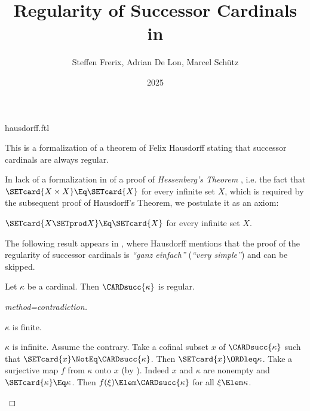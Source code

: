 \documentclass{stex}
\title{Regularity of Successor Cardinals in \Naproche}
\author{Steffen Frerix, Adrian De Lon, Marcel Schütz}
\date{2025}
\begin{document}
\begin{smodule}{hausdorff.ftl}
\maketitle



\noindent This is a formalization of a theorem of Felix Hausdorff stating that
successor cardinals are always regular.

In lack of a formalization in \Naproche of a proof of \emph{Hessenberg's
Theorem} \cite{Hessenberg1906}, i.e. the fact that
$\SETcard{X \times X} \Eq \SETcard{X}$ for every
infinite set $X$, which is required by the subsequent
proof of Hausdorff's Theorem, we postulate it as an axiom:

\begin{axiom*}[forthel,title=Hessenberg's Theorem,name=Hessenberg]
  $\SETcard{X \SETprod X} \Eq \SETcard{X}$ for every infinite set $X$.
\end{axiom*}

The following result appears in \cite[p.~443]{Hausdorff1908},
where Hausdorff mentions that the proof of the regularity of successor
cardinals is \textit{``ganz einfach''} (\textit{``very simple''})
and can be skipped.

\begin{forthel}
  \begin{theorem*}[title=Hausdorff,name=Hausdorff]
    Let $\kappa$ be a cardinal.
    Then $\CARDsucc{\kappa}$ is regular.
  \end{theorem*}
  \begin{proof}[method=contradiction]
    \begin{case}{$\kappa$ is finite.} \end{case}

    \begin{case}{$\kappa$ is infinite.}
      Assume the contrary.
      Take a cofinal subset $x$ of $\CARDsucc{\kappa}$ such that $\SETcard{x} \NotEq \CARDsucc{\kappa}$.
      Then $\SETcard{x} \ORDleq \kappa$.
      Take a surjective map $f$ from $\kappa$ onto $x$ (by ).
      Indeed $x$ and $\kappa$ are nonempty and $\SETcard{\kappa} \Eq \kappa$.
      Then $f(\xi) \Elem \CARDsucc{\kappa}$ for all $\xi \Elem \kappa$.
  

\end{case}
\end{proof}
\end{forthel}
\end{smodule}
\end{document}
